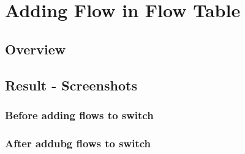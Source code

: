 \section{Adding Flow in Flow Table}

\subsection{Overview}

\subsection{Result - Screenshots}

\subsubsection{Before adding flows to switch}

\subsubsection{After addubg flows to switch}

\clearpage